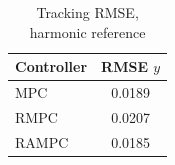 \begin{table}[t]
\centering
\caption{Tracking RMSE, harmonic reference}
\label{tab:rmse_duffing_harmonic_mpc_rmpc_rampc}
\begin{tabular}{lc}
\toprule
Controller & RMSE $y$ \\
\midrule
MPC & 0.0189 \\
RMPC & 0.0207 \\
RAMPC & 0.0185 \\
\bottomrule
\end{tabular}
\end{table}
